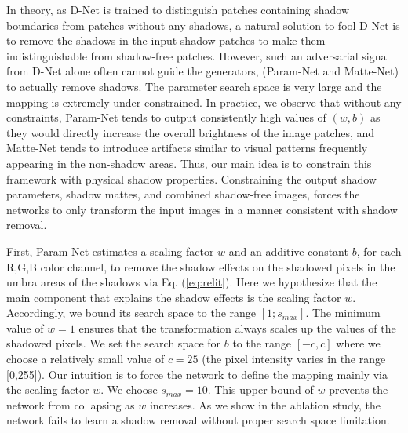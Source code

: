 \documentclass[runningheads]{llncs}
\begin{document}
In theory, as D-Net is trained to distinguish patches containing shadow boundaries from patches without any shadows, a natural solution to fool D-Net is to remove the shadows in the input shadow patches to make them indistinguishable from shadow-free patches. However, such an adversarial signal from D-Net alone often cannot guide the generators, (Param-Net and Matte-Net) to actually remove shadows. The parameter search space is very large and the mapping is extremely under-constrained. In practice, we observe that without any constraints, Param-Net tends to output consistently high values of $(w,b)$ as they would directly increase the overall brightness of the image patches, and Matte-Net tends to introduce artifacts similar to visual patterns frequently appearing in the non-shadow areas.
Thus, our main idea is to constrain this framework with physical shadow properties.  Constraining the output shadow parameters, shadow mattes, and combined shadow-free images, forces the networks to only transform the input images in a manner consistent with shadow removal. 

First, Param-Net estimates a scaling factor $w$ and an additive constant $b$, for each R,G,B color channel, to remove the shadow effects on the shadowed pixels in the umbra areas of the shadows via Eq. (\ref{eq:relit}). Here we hypothesize that the main component that explains the shadow effects is the scaling factor $w$. Accordingly, we bound its search space to the range $[1; s_{max}]$. The minimum value of $w=1$ ensures that the transformation always scales up the values of the shadowed pixels. We set the search space for $b$ to the range $[-c,c]$ where we choose a relatively small value of $c=25$ (the pixel intensity varies in the range [0,255]). Our intuition is to force the network to define the mapping mainly via the scaling factor $w$. We choose $s_{max}=10$. This upper bound of $w$ prevents the network from collapsing as $w$  increases. As we show in the ablation study, the network fails to learn a shadow removal without  proper search space limitation. 
\end{document}
